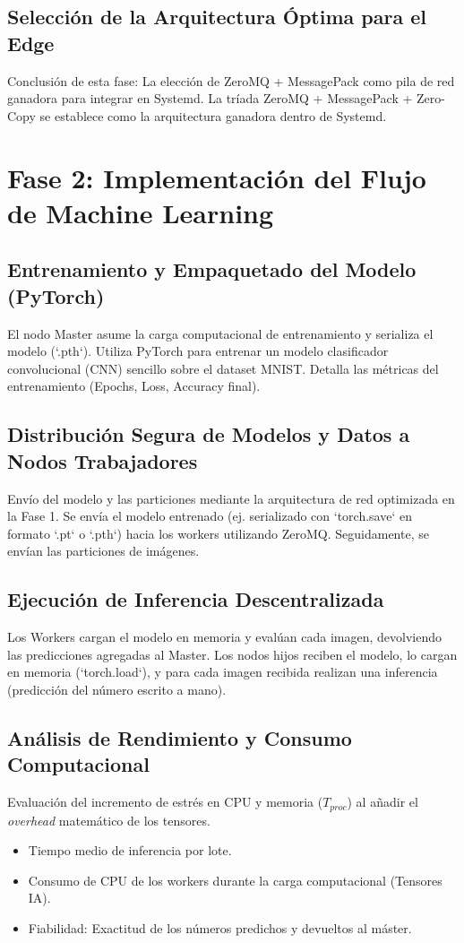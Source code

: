 \documentclass[11pt, a4paper]{report}
\begin{document}
\section{Selección de la Arquitectura Óptima para el Edge}
Conclusión de esta fase: La elección de ZeroMQ + MessagePack como pila de red ganadora para integrar en Systemd. La tríada ZeroMQ + MessagePack + Zero-Copy se establece como la arquitectura ganadora dentro de Systemd.

\chapter{Fase 2: Implementación del Flujo de Machine Learning}

\section{Entrenamiento y Empaquetado del Modelo (PyTorch)}
El nodo Master asume la carga computacional de entrenamiento y serializa el modelo (`.pth`). Utiliza PyTorch para entrenar un modelo clasificador convolucional (CNN) sencillo sobre el dataset MNIST. Detalla las métricas del entrenamiento (Epochs, Loss, Accuracy final).

\section{Distribución Segura de Modelos y Datos a Nodos Trabajadores}
Envío del modelo y las particiones mediante la arquitectura de red optimizada en la Fase 1. Se envía el modelo entrenado (ej. serializado con `torch.save` en formato `.pt` o `.pth`) hacia los workers utilizando ZeroMQ. Seguidamente, se envían las particiones de imágenes.

\section{Ejecución de Inferencia Descentralizada}
Los Workers cargan el modelo en memoria y evalúan cada imagen, devolviendo las predicciones agregadas al Master. Los nodos hijos reciben el modelo, lo cargan en memoria (`torch.load`), y para cada imagen recibida realizan una inferencia (predicción del número escrito a mano).

\section{Análisis de Rendimiento y Consumo Computacional}
Evaluación del incremento de estrés en CPU y memoria ($T_{proc}$) al añadir el \textit{overhead} matemático de los tensores.
\begin{itemize}
    \item Tiempo medio de inferencia por lote.
    \item Consumo de CPU de los workers durante la carga computacional (Tensores IA).
    \item Fiabilidad: Exactitud de los números predichos y devueltos al máster.
\end{itemize}
\end{document}
